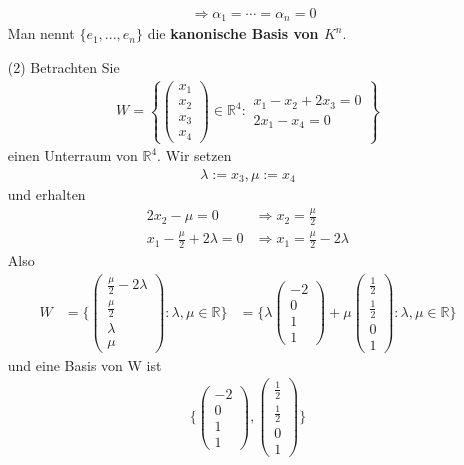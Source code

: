 \documentclass[11pt]{report}
\newcommand*\Zb[1] {\mathbb{#1}}
\newcommand*\f[1] {\textbf{#1}}
\begin{document}
\begin{itemize}
\begin{align}
 &\Rightarrow \alpha_1 = \cdots = \alpha_n = 0
\end{align}
Man nennt $\{e_1, ..., e_n\}$ die \f{kanonische Basis von $K^n$}.
\item[(2)] Betrachten Sie 
\begin{align}
 W = \left\{\begin{pmatrix} x_1 \\ x_2 \\ x_3 \\ x_4 \end{pmatrix} \in \Zb{R}^4: \begin{matrix} x_1 - x_2 + 2x_3 = 0 \\ 2x_1 - x_4 = 0\end{matrix} \right\}
\end{align}
einen Unterraum von $\Zb{R}^4$.
Wir setzen
\begin{align}
 \lambda := x_3, \mu := x_4
\end{align}
und erhalten
\begin{align}
 2x_2 - \mu = 0 &\Rightarrow x_2 = \frac{\mu}{2} \\
 x_1 - \frac{\mu}{2} + 2\lambda = 0 &\Rightarrow x_1 = \frac{\mu}{2}-2\lambda
\end{align}
Also
\begin{align}
 W &= \{\begin{pmatrix} \frac{\mu}{2}-2\lambda \\ \frac{\mu}{2} \\ \lambda \\ \mu \end{pmatrix}: \lambda, \mu \in \Zb{R}\}
   &= \{\lambda \begin{pmatrix} -2 \\ 0 \\ 1 \\ 1 \end{pmatrix} + \mu \begin{pmatrix} \frac{1}{2} \\ \frac{1}{2} \\ 0 \\ 1 \end{pmatrix}: \lambda, \mu \in \Zb{R}\}
\end{align}
und eine Basis von W ist
\begin{align}
 \{\begin{pmatrix} -2 \\ 0 \\ 1 \\ 1 \end{pmatrix}, \begin{pmatrix} \frac{1}{2} \\ \frac{1}{2} \\ 0 \\ 1 \end{pmatrix}\}

\end{align}
\end{itemize}
\end{document}
